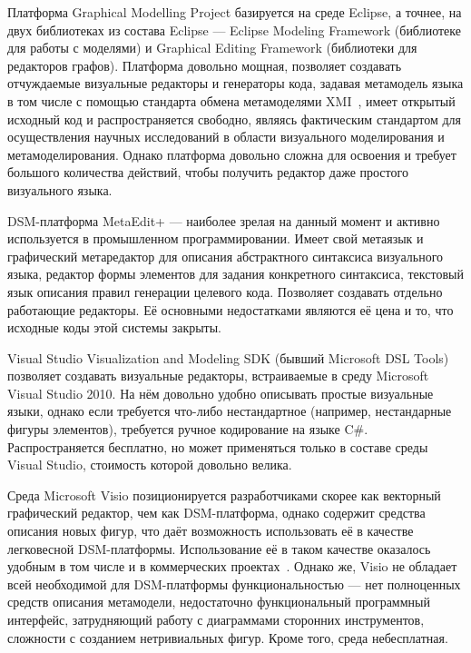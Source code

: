 \documentclass[a4paper]{article}
\begin{document}
Платформа Graphical Modelling Project базируется на среде Eclipse, а точнее, на двух библиотеках из состава Eclipse --- Eclipse Modeling Framework (библиотеке для работы с моделями) и Graphical Editing Framework (библиотеки для редакторов графов). Платформа довольно мощная, позволяет создавать отчуждаемые визуальные редакторы и генераторы кода, задавая метамодель языка в том числе с помощью стандарта обмена метамоделями XMI~\cite{xmi}, имеет открытый исходный код и распространяется свободно, являясь фактическим стандартом для осуществления научных исследований в области визуального моделирования и метамоделирования. Однако платформа довольно сложна для освоения и требует большого количества действий, чтобы получить редактор даже простого визуального языка. 

DSM-платформа MetaEdit+ --- наиболее зрелая на данный момент и активно используется в промышленном программировании. Имеет свой метаязык и графический метаредактор для описания абстрактного синтаксиса визуального языка, редактор формы элементов для задания конкретного синтаксиса, текстовый язык описания правил генерации целевого кода. Позволяет создавать отдельно работающие редакторы. Её основными недостатками являются её цена и то, что исходные коды этой системы закрыты.

Visual Studio Visualization and Modeling SDK (бывший Microsoft DSL Tools) позволяет создавать визуальные редакторы, встраиваемые в среду Microsoft Visual Studio 2010. На нём довольно удобно описывать простые визуальные языки, однако если требуется что-либо нестандартное (например, нестандарные фигуры элементов), требуется ручное кодирование на языке C\#. Распространяется бесплатно, но может применяться только в составе среды Visual Studio, стоимость которой довольно велика.

Среда Microsoft Visio позиционируется разработчиками скорее как векторный графический редактор, чем как DSM-платформа, однако содержит средства описания новых фигур, что даёт возможность использовать её в качестве легковесной DSM-платформы. Использование её в таком качестве оказалось удобным в том числе и в коммерческих проектах~\cite{videoDsl}. Однако же, Visio не обладает всей необходимой для DSM-платформы функциональностью --- нет полноценных средств описания метамодели, недостаточно функциональный программный интерфейс, затрудняющий работу с диаграммами сторонних инструментов, сложности с созданием нетривиальных фигур. Кроме того, среда небесплатная.
\end{document}
